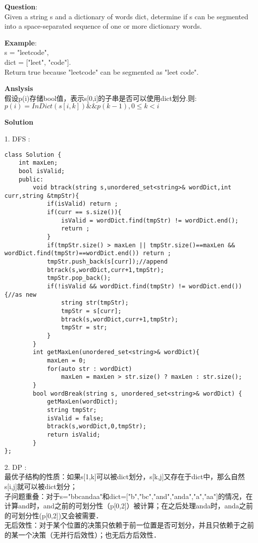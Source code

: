     
\begin{description}
    \item{\textbf{Question}}:\\%
Given a string s and a dictionary of words dict, determine if s can be segmented into a space-separated sequence of one or more dictionary words.%

    \item{\textbf{Example}}:\\
s = "leetcode",\\
dict = ["leet", "code"].\\
Return true because "leetcode" can be segmented as "leet code".\\
    \item{\textbf{Anslysis}}\\
		假设p(i)存储bool值，表示s[0,i]的子串是否可以使用dict划分.则:\\
		$p(i)= InDict(s[i,k]) \&\& p(k-1), 0\leq k< i$

    \item{\textbf{Solution}}\\
	\item{1. DFS} : \\
		\begin{lstlisting}
class Solution {
	int maxLen;
	bool isValid;
	public:
		void btrack(string s,unordered_set<string>& wordDict,int curr,string &tmpStr){
			if(isValid) return ;
			if(curr == s.size()){
				isValid = wordDict.find(tmpStr) != wordDict.end();
				return ;
			}
			if(tmpStr.size() > maxLen || tmpStr.size()==maxLen && wordDict.find(tmpStr)==wordDict.end()) return ;
			tmpStr.push_back(s[curr]);//append
			btrack(s,wordDict,curr+1,tmpStr);
			tmpStr.pop_back();
			if(!isValid && wordDict.find(tmpStr) != wordDict.end()){//as new
				string str(tmpStr);
				tmpStr = s[curr];
				btrack(s,wordDict,curr+1,tmpStr);
				tmpStr = str;
			}
		}
		int getMaxLen(unordered_set<string>& wordDict){
			maxLen = 0;
			for(auto str : wordDict)
				maxLen = maxLen > str.size() ? maxLen : str.size();
		}
		bool wordBreak(string s, unordered_set<string>& wordDict) {
			getMaxLen(wordDict);
			string tmpStr;
			isValid = false;
			btrack(s,wordDict,0,tmpStr);
			return isValid;
		}
};
		\end{lstlisting}

	\item{2. DP} : \\
		最优子结构的性质：如果s[1,k]可以被dict划分，s[k,j]又存在于dict中，那么自然s[i,j]就可以被dict划分；\\
		子问题重叠：对于s="bbcandaa"和dict=["b","bc","and","anda","a","aa"]的情况，在计算and时，and之前的可划分性（p[0,2]）被计算；在之后处理anda时，anda之前的可划分性(p[0,2])又会被需要．\\
		无后效性：对于某个位置的决策只依赖于前一位置是否可划分，并且只依赖于之前的某一个决策（无并行后效性）；也无后方后效性．\\


\end{description}
